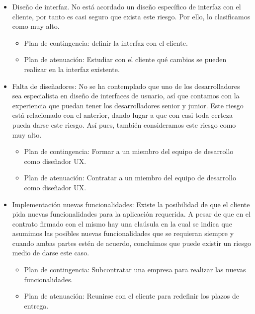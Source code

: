 \documentclass[a4paper,11pt]{report}
\begin{document}
\begin{itemize}
    \item Diseño de interfaz. No está acordado un diseño específico de interfaz
    con el cliente, por tanto es casi seguro que exista este riesgo. Por ello,
    lo clasificamos como muy alto.
    \begin{itemize}
        \item Plan de contingencia: definir la interfaz con el cliente.
        \item Plan de atenuación: Estudiar con el cliente qué cambios se pueden
        realizar en la interfaz existente.
    \end{itemize}

    \item Falta de diseñadores: No se ha contemplado que uno de los
    desarrolladores sea especialista en diseño de interfaces de usuario, así que
    contamos con la experiencia que puedan tener los desarrolladores senior y
    junior. Este riesgo está relacionado con el anterior, dando lugar a que con
    casi toda certeza pueda darse este riesgo. Así pues, también consideramos
    este riesgo como muy alto.
    \begin{itemize}
        \item Plan de contingencia: Formar a un miembro del equipo de desarrollo
        como diseñador UX.
        \item Plan de atenuación: Contratar a un miembro del equipo de
        desarrollo como diseñador UX.
    \end{itemize}

    \item Implementación nuevas funcionalidades: Existe la posibilidad de que
    el cliente pida nuevas funcionalidades para la aplicación requerida. A pesar
    de que en el contrato firmado con el mismo hay una claúsula en la cual se
    indica que asumimos las posibles nuevas funcionalidades que se requieran
    siempre y cuando ambas partes estén de acuerdo, concluimos que puede existir
    un riesgo medio de darse este caso.
    \begin{itemize}
        \item Plan de contingencia: Subcontratar una empresa para realizar
        las nuevas funcionalidades.
        \item Plan de atenuación: Reunirse con el cliente para redefinir los
        plazos de entrega.
    \end{itemize}


\end{itemize}
\end{document}

